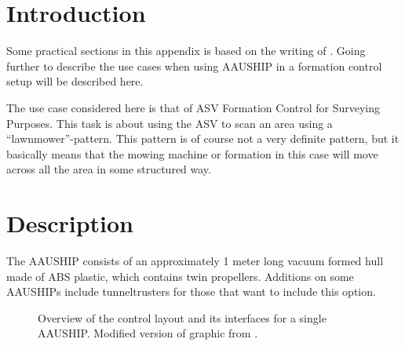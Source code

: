 \section{Introduction}

Some practical sections in this appendix is based on the writing of
\cite{12gr730}. Going further to describe the use cases when using
AAUSHIP in a formation control setup will be described here.

The use case considered here is that of \ac{ASV} Formation Control for
Surveying Purposes. This task is about using the \ac{ASV} to scan an
area using a ``lawnmower''-pattern. This pattern is of course not a
very definite pattern, but it basically means that the mowing machine
or formation in this case will move across all the area in some structured way.

\section{Description} The AAUSHIP consists of an approximately 1 meter
long vacuum formed hull made of ABS plastic, which contains twin
propellers. Additions on some AAUSHIPs include tunneltrusters for
those that want to include this option.

\begin{figure}[htbp]
	
	\caption{Overview of the control layout and its interfaces for a
		single AAUSHIP.
		Modified version of graphic from \citep{12gr730}.}
	\label{fig:vessel-block-overview}
\end{figure}

